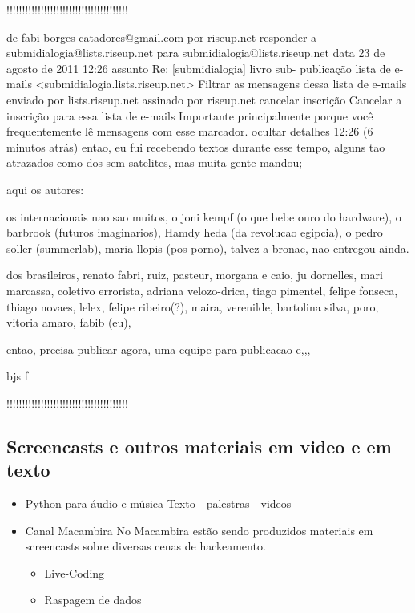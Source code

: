 \begin{itemize}
!!!!!!!!!!!!!!!!!!!!!!!!!!!!!!!!!!!!!!!

de      fabi borges catadores@gmail.com por  riseup.net 
responder a     submidialogia@lists.riseup.net
para    submidialogia@lists.riseup.net
data    23 de agosto de 2011 12:26
assunto Re: [submidialogia] livro sub- publicação
lista de e-mails        <submidialogia.lists.riseup.net> Filtrar as mensagens dessa lista de e-mails
enviado por     lists.riseup.net
assinado por    riseup.net
cancelar inscrição      Cancelar a inscrição para essa lista de e-mails
        Importante principalmente porque você frequentemente lê mensagens com esse marcador.
ocultar detalhes 12:26 (6 minutos atrás)
entao, eu fui recebendo textos durante esse tempo,
alguns tao atrazados como dos sem satelites, mas muita gente mandou;

aqui os autores:

os internacionais nao sao muitos, o joni kempf (o que bebe ouro do hardware), o barbrook (futuros imaginarios),
Hamdy heda (da revolucao egipcia), o pedro soller (summerlab), maria llopis (pos porno),  talvez a bronac, nao entregou ainda.

dos brasileiros, renato fabri, ruiz, pasteur, morgana e caio, ju dornelles, mari marcassa, coletivo errorista, adriana velozo-drica, tiago pimentel, felipe fonseca, thiago novaes, lelex, felipe ribeiro(?), maira, verenilde,  bartolina silva, poro, vitoria amaro, fabib (eu),

entao, precisa publicar agora,
uma equipe para publicacao e,,, 

bjs
f

!!!!!!!!!!!!!!!!!!!!!!!!!!!!!!!!!!!!!!!

\end{itemize}

\subsection{Screencasts e outros materiais em video e em texto}

\begin{itemize}
    \item Python para áudio e música
	  Texto - palestras - videos

    \item Canal Macambira
No Macambira estão sendo produzidos materiais em screencasts sobre
diversas cenas de hackeamento.

    \begin{itemize}
	\item Live-Coding
	\item Raspagem de dados
    \end{itemize}
\end{itemize}


